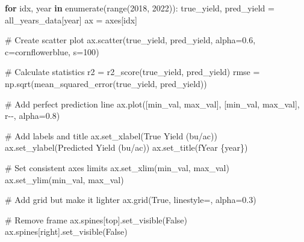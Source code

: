 \documentclass[
  letterpaper,
  DIV=11,
  numbers=noendperiod]{scrreprt}
\newenvironment{Shaded}{\begin{snugshade}}{\end{snugshade}}
\newcommand{\BuiltInTok}[1]{\textcolor[rgb]{0.00,0.23,0.31}{#1}}
\newcommand{\CommentTok}[1]{\textcolor[rgb]{0.37,0.37,0.37}{#1}}
\newcommand{\ControlFlowTok}[1]{\textcolor[rgb]{0.00,0.23,0.31}{\textbf{#1}}}
\newcommand{\DecValTok}[1]{\textcolor[rgb]{0.68,0.00,0.00}{#1}}
\newcommand{\FloatTok}[1]{\textcolor[rgb]{0.68,0.00,0.00}{#1}}
\newcommand{\KeywordTok}[1]{\textcolor[rgb]{0.00,0.23,0.31}{\textbf{#1}}}
\newcommand{\NormalTok}[1]{\textcolor[rgb]{0.00,0.23,0.31}{#1}}
\newcommand{\OperatorTok}[1]{\textcolor[rgb]{0.37,0.37,0.37}{#1}}
\newcommand{\SpecialCharTok}[1]{\textcolor[rgb]{0.37,0.37,0.37}{#1}}
\newcommand{\SpecialStringTok}[1]{\textcolor[rgb]{0.13,0.47,0.30}{#1}}
\newcommand{\StringTok}[1]{\textcolor[rgb]{0.13,0.47,0.30}{#1}}
\newcommand{\VariableTok}[1]{\textcolor[rgb]{0.07,0.07,0.07}{#1}}
\begin{document}
\begin{Shaded}
\begin{Highlighting}[]
    \ControlFlowTok{for}\NormalTok{ idx, year }\KeywordTok{in} \BuiltInTok{enumerate}\NormalTok{(}\BuiltInTok{range}\NormalTok{(}\DecValTok{2018}\NormalTok{, }\DecValTok{2022}\NormalTok{)):}
\NormalTok{        true\_yield, pred\_yield }\OperatorTok{=}\NormalTok{ all\_years\_data[year]}
\NormalTok{        ax }\OperatorTok{=}\NormalTok{ axes[idx]}

        \CommentTok{\# Create scatter plot}
\NormalTok{        ax.scatter(true\_yield, pred\_yield,}
\NormalTok{                  alpha}\OperatorTok{=}\FloatTok{0.6}\NormalTok{,}
\NormalTok{                  c}\OperatorTok{=}\StringTok{\textquotesingle{}cornflowerblue\textquotesingle{}}\NormalTok{,}
\NormalTok{                  s}\OperatorTok{=}\DecValTok{100}\NormalTok{)}

        \CommentTok{\# Calculate statistics}
\NormalTok{        r2 }\OperatorTok{=}\NormalTok{ r2\_score(true\_yield, pred\_yield)}
\NormalTok{        rmse }\OperatorTok{=}\NormalTok{ np.sqrt(mean\_squared\_error(true\_yield, pred\_yield))}

        \CommentTok{\# Add perfect prediction line}
\NormalTok{        ax.plot([min\_val, max\_val], [min\_val, max\_val],}
                \StringTok{\textquotesingle{}r{-}{-}\textquotesingle{}}\NormalTok{, alpha}\OperatorTok{=}\FloatTok{0.8}\NormalTok{)}

        \CommentTok{\# Add labels and title}
\NormalTok{        ax.set\_xlabel(}\StringTok{\textquotesingle{}True Yield (bu/ac)\textquotesingle{}}\NormalTok{)}
\NormalTok{        ax.set\_ylabel(}\StringTok{\textquotesingle{}Predicted Yield (bu/ac)\textquotesingle{}}\NormalTok{)}
\NormalTok{        ax.set\_title(}\SpecialStringTok{f\textquotesingle{}Year }\SpecialCharTok{\{}\NormalTok{year}\SpecialCharTok{\}}\SpecialStringTok{\textquotesingle{}}\NormalTok{)}

        \CommentTok{\# Set consistent axes limits}
\NormalTok{        ax.set\_xlim(min\_val, max\_val)}
\NormalTok{        ax.set\_ylim(min\_val, max\_val)}

        \CommentTok{\# Add grid but make it lighter}
\NormalTok{        ax.grid(}\VariableTok{True}\NormalTok{, linestyle}\OperatorTok{=}\StringTok{\textquotesingle{}{-}{-}\textquotesingle{}}\NormalTok{, alpha}\OperatorTok{=}\FloatTok{0.3}\NormalTok{)}

        \CommentTok{\# Remove frame}
\NormalTok{        ax.spines[}\StringTok{\textquotesingle{}top\textquotesingle{}}\NormalTok{].set\_visible(}\VariableTok{False}\NormalTok{)}
\NormalTok{        ax.spines[}\StringTok{\textquotesingle{}right\textquotesingle{}}\NormalTok{].set\_visible(}\VariableTok{False}\NormalTok{)}


\end{Highlighting}
\end{Shaded}
\end{document}

